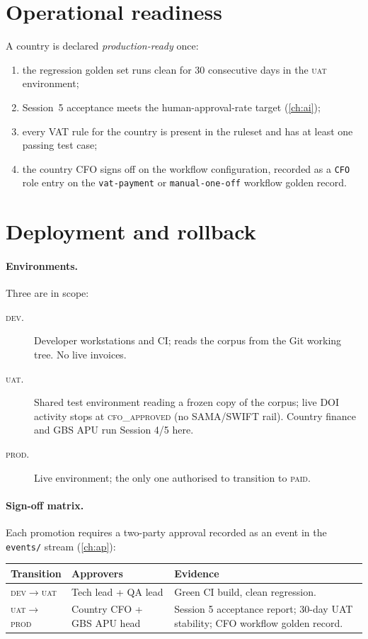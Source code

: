 \documentclass[11pt,a4paper,twoside]{report}
\begin{document}
\section{Operational readiness}

A country is declared \emph{production-ready} once:
\begin{enumerate}
\item the regression golden set runs clean for 30 consecutive days
in the \textsc{uat} environment;
\item Session~5 acceptance meets the human-approval-rate target
(\cref{ch:ai});
\item every VAT rule for the country is present in the ruleset and
has at least one passing test case;
\item the country CFO signs off on the workflow configuration,
recorded as a \texttt{CFO} role entry on the \texttt{vat-payment}
or \texttt{manual-one-off} workflow golden record.
\end{enumerate}

\section{Deployment and rollback}

\paragraph{Environments.} Three are in scope:
\begin{description}
\item[\textsc{dev}.] Developer workstations and CI; reads the corpus
from the Git working tree. No live invoices.
\item[\textsc{uat}.] Shared test environment reading a frozen copy of
the corpus; live DOI activity stops at \textsc{cfo\_approved}
(no SAMA/SWIFT rail). Country finance and GBS APU run Session
4/5 here.
\item[\textsc{prod}.] Live environment; the only one authorised to
transition to \textsc{paid}.
\end{description}

\paragraph{Sign-off matrix.} Each promotion requires a two-party
approval recorded as an event in the \texttt{events/} stream
(\cref{ch:ap}):

\begin{tabularx}{\linewidth}{@{}l l X@{}}
\toprule
\textbf{Transition} & \textbf{Approvers} & \textbf{Evidence} \\ \midrule
\textsc{dev}$\to$\textsc{uat}  & Tech lead + QA lead           & Green CI build, clean regression. \\
\textsc{uat}$\to$\textsc{prod} & Country CFO + GBS APU head    & Session 5 acceptance report; 30-day UAT stability; CFO workflow golden record. \\
\bottomrule
\end{tabularx}
\end{document}
